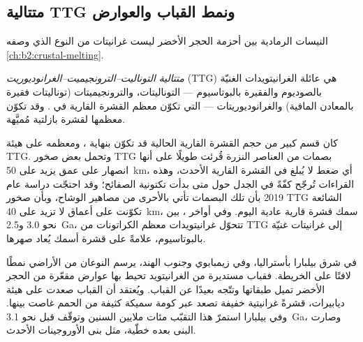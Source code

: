\subsection*{متتالية TTG ونمط القباب والعوارض}

النيسات الرمادية بين أحزمة الحجر الأخضر ليست غرانيتات من النوع الذي
وصفه \cref{ch:b2:crustal-melting}.

\begin{definition}\label{def:b2:precambrian-earth:ttg}
\emph{متتالية التوناليت--الترونجيميت--الغرانوديوريت} (TTG) هي عائلة الغرانيتويدات الغنيّة بالصوديوم والفقيرة بالبوتاسيوم --- التوناليتات،
والترونجيميتات (توناليتات فقيرة بالمعادن المافية) والغرانوديوريتات --- التي تكوّن معظم
القشرة القارية في . وقد تكوّن معظمها  لقشرة بازلتية
مُميَّهة.
\end{definition}

كان قسم كبير من حجم القشرة القارية الحالية قد تكوّن بنهاية ، ومعظمه
على هيئة TTG. وتحمل بعض صخور TTG بصمات من العناصر النزرة قُرئت طويلًا على أنها انصهار على عمق
يزيد على \qty{50}{km}، أي ضغط لا يُبلغ في القشرة القارية الأحدث، وهذه القراءات
تُرجّح كفّةً في الجدل حول متى بدأت تكتونية الصفائح؛ وقد احتجّت دراسة عام 2019 بأن تلك البصمات
تأتي بالأحرى من مصاهير الوشاح، وبأن صخور TTG الشائعة تكوّنت على
أعماق لا تزيد على \qty{40}{km}، سمك قشرة قارية عادية اليوم. وفي أواخر
، بين نحو 3.0 و\qty{2.5}{Ga}، تتحوّل غرانيتويدات معظم الكراتونات من TTG
إلى غرانيتات غنيّة بالبوتاسيوم، علامةً على قشرة أسمك يُعاد صهرها.

في شرق بيلبارا بأستراليا، وفي زيمبابوي وجنوب الهند، يرسم النوعان من الأراضي نمطًا
لافتًا على الخريطة. فقباب مستديرة من الغرانيتويد تحيط بها عوارض مقعّرة من الحجر الأخضر تميل طبقاتها وتتّجه بعيدًا عن القباب. ويُعتقد
أن القباب صعدت على هيئة ديابيرات، قشرةً غرانيتية خفيفة تصعد عبر كومة سميكة كثيفة من
الحمم غاصت بينها. وفي بيلبارا استمرّ هذا التقبّب مئات ملايين
السنين وتوقّف قبل نحو \qty{3.1}{Ga}، وصارت البنى بعده خطّية، مثل بنى
الأوروجينات الأحدث.


